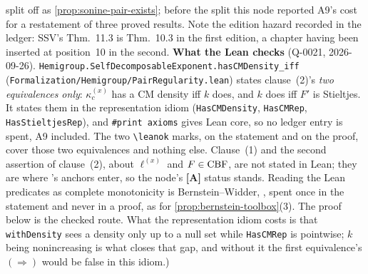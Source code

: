 \begin{proposition}
{split off as \ref{prop:sonine-pair-exists}; before the split this node reported A9's cost for a
restatement of three proved results. Note the edition hazard recorded in the ledger: SSV's
Thm.~11.3 is Thm.~10.3 in the first edition, a chapter having been inserted at position~10 in
the second.
\textbf{What the Lean checks} (Q-0021, 2026-09-26).
\texttt{Hemigroup.SelfDecomposableExponent.hasCMDensity\_iff}
(\texttt{Formalization/Hemigroup/PairRegularity.lean}) states clause~(2)'s \emph{two equivalences
only}: $\kappa_c^{(x)}$ has a CM density iff $k$ does, and $k$ does iff $F'$ is Stieltjes. It
states them in the representation idiom (\texttt{HasCMDensity}, \texttt{HasCMRep},
\texttt{HasStieltjesRep}), and \texttt{\#print axioms} gives Lean core, so no ledger entry is
spent, A9 included. The two \texttt{\textbackslash leanok} marks, on the statement and on the
proof, cover those two equivalences and nothing else. Clause~(1) and the second assertion of clause~(2), about $\ell^{(x)}$ and $F \in \mathrm{CBF}$, are
not stated in Lean; they are where 's anchors enter, so the node's \textbf{[A]} status
stands. Reading the Lean predicates as complete monotonicity is Bernstein--Widder, ,
spent once in the statement and never in a proof, as for \ref{prop:bernstein-toolbox}(3). The proof
below is the checked route. What the representation idiom costs is that \texttt{withDensity} sees a
density only up to a null set while \texttt{HasCMRep} is pointwise; $k$ being nonincreasing is what
closes that gap, and without it the first equivalence's $(\Rightarrow)$ would be false in this
idiom.)}
\end{proposition}

